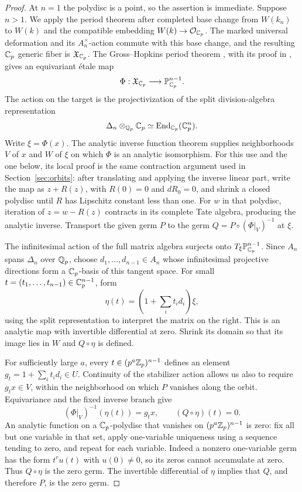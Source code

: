 \begin{proof}
At \(n=1\) the polydisc is a point, so the assertion is immediate.
Suppose \(n>1\).  We apply the period theorem after completed base
change from \(W(k_n)\) to \(W(k)\) and the compatible embedding
\(W(k)\to\mathcal O_{\mathbb C_p}\).  The marked universal deformation and its
\(A_n^\times\)-action commute with this base change, and the resulting
\(\mathbb C_p\) generic fiber is \(\mathfrak X_{\mathbb C_p}\).
The Gross--Hopkins period theorem
\cite[Section~1.1, Theorem~1]{GH94}, with its proof in
\cite[Proposition~23.5]{HG94Bundles}, gives an equivariant \'etale map
\[
  \Phi:\mathfrak X_{\mathbb C_p}\longrightarrow\mathbb P^{n-1}_{\mathbb C_p}.
\]
The action on the target is the projectivization of the split
division-algebra representation
\[
  \Delta_n\otimes_{\mathbb Q_p}\mathbb C_p
       \simeq\operatorname{End}_{\mathbb C_p}(\mathbb C_p^n).
\]
Write \(\xi=\Phi(x)\).
The analytic inverse function theorem supplies neighborhoods \(V\) of
\(x\) and \(W\) of \(\xi\) on which \(\Phi\) is an analytic isomorphism.
For this use and the one below, its local proof is the same contraction
argument used in Section~\ref{sec:orbits}: after translating and applying
the inverse linear part, write the map as \(z+R(z)\), with
\(R(0)=0\) and \(dR_0=0\), and shrink a closed polydisc until \(R\)
has Lipschitz constant less than one.
For \(w\) in that polydisc, iteration of \(z=w-R(z)\) contracts in its
complete Tate algebra, producing the analytic inverse.
Transport the given germ \(P\) to the germ
\(Q=P\circ(\Phi|_V)^{-1}\) at \(\xi\).

The infinitesimal action of the full matrix algebra surjects onto
\(T_\xi\mathbb P^{n-1}_{\mathbb C_p}\).  Since \(A_n\) spans \(\Delta_n\)
over \(\mathbb Q_p\), choose \(d_1,\ldots,d_{n-1}\in A_n\) whose infinitesimal
projective directions form a \(\mathbb C_p\)-basis of this tangent space.
For small \(t=(t_1,\ldots,t_{n-1})\in\mathbb C_p^{n-1}\), form
\[
  \eta(t)=\left(1+\sum_i t_i d_i\right)\xi,
\]
using the split representation to interpret the matrix on the right.
This is an analytic map with invertible differential at zero.
Shrink its domain so that its image lies in \(W\) and \(Q\circ\eta\)
is defined.

For sufficiently large \(a\), every
\(t\in(p^a\mathbb Z_p)^{n-1}\) defines an element
\(g_t=1+\sum_i t_i d_i\in U\).
Continuity of the stabilizer action allows us also to require
\(g_t x\in V\), within the neighborhood on which \(P\) vanishes along
the orbit.  Equivariance and the fixed inverse branch give
\[
  (\Phi|_V)^{-1}(\eta(t))=g_t x,
  \qquad (Q\circ\eta)(t)=0.
\]
An analytic function on a \(\mathbb C_p\)-polydisc that vanishes on
\((p^a\mathbb Z_p)^{n-1}\) is zero: fix all but one variable in that set,
apply one-variable uniqueness using a sequence tending to zero,
and repeat for each variable.  Indeed a nonzero one-variable germ has
the form \(t^r u(t)\) with \(u(0)\ne0\), so its zeros cannot
accumulate at zero.  Thus \(Q\circ\eta\) is the zero germ.
The invertible differential of \(\eta\) implies that \(Q\), and
therefore \(P\), is the zero germ.
\end{proof}

